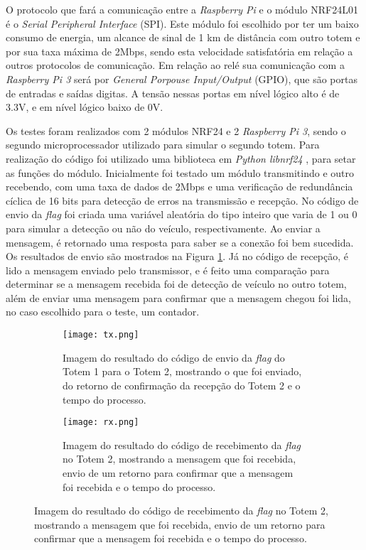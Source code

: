 O protocolo que fará a comunicação entre a \emph{Raspberry Pi} e o módulo NRF24L01 é o \emph{Serial Peripheral Interface} (SPI). Este módulo foi escolhido por ter um baixo consumo de energia, um alcance de sinal de 1 km de distância com outro totem e por sua taxa máxima de 2Mbps, sendo esta velocidade satisfatória em relação a outros protocolos de comunicação. Em relação ao relé sua comunicação com a \emph{Raspberry Pi 3} será por \emph{General Porpouse Input/Output} (GPIO), que são portas de entradas e saídas digitas. A tensão nessas portas em nível lógico alto é de 3.3V, e em nível lógico baixo de 0V. \par
Os testes foram realizados com 2 módulos NRF24 e 2 \emph{Raspberry Pi 3}, sendo o segundo microprocessador utilizado para simular o segundo totem. Para realização do código foi utilizado uma biblioteca em \emph{Python libnrf24} , para setar as funções do módulo. Inicialmente foi testado um módulo transmitindo e outro recebendo, com uma taxa de dados de 2Mbps e uma verificação de redundância cíclica de 16 bits para detecção de erros na transmissão e recepção. 
No código de envio da \emph{flag} foi criada uma variável aleatória do tipo inteiro que varia de 1 ou 0 para simular a detecção ou não do veículo, respectivamente. Ao enviar a mensagem, é retornado uma resposta para saber se a conexão foi bem sucedida. Os resultados de envio são mostrados na Figura \ref{tx}. Já no código de recepção, é lido a mensagem enviado pelo transmissor, e é feito uma comparação para determinar se a mensagem recebida foi de detecção de veículo no outro totem, além de enviar uma mensagem para confirmar que a mensagem chegou foi lida, no caso escolhido para o teste, um contador.

\begin{figure}[H]
    \centering
     \begin{subfigure}{0.49\textwidth}
        \texttt{[image: tx.png]}
        \caption{Imagem do resultado do código de envio da \emph{flag} do Totem 1 para o Totem 2, mostrando o que foi enviado, do retorno de confirmação da recepção do Totem 2 e o tempo do processo.}
          \label{tx}
      \end{subfigure}
        \hfill
      \begin{subfigure}{0.49\textwidth}
        \texttt{[image: rx.png]}
        \caption{Imagem do resultado do código de recebimento da \emph{flag} no Totem 2, mostrando a mensagem que foi recebida, envio de um retorno para confirmar que a mensagem foi recebida e o tempo do processo.}
          \label{rx}
      \end{subfigure}
        \hfill
        \label{}
\end{figure} 

